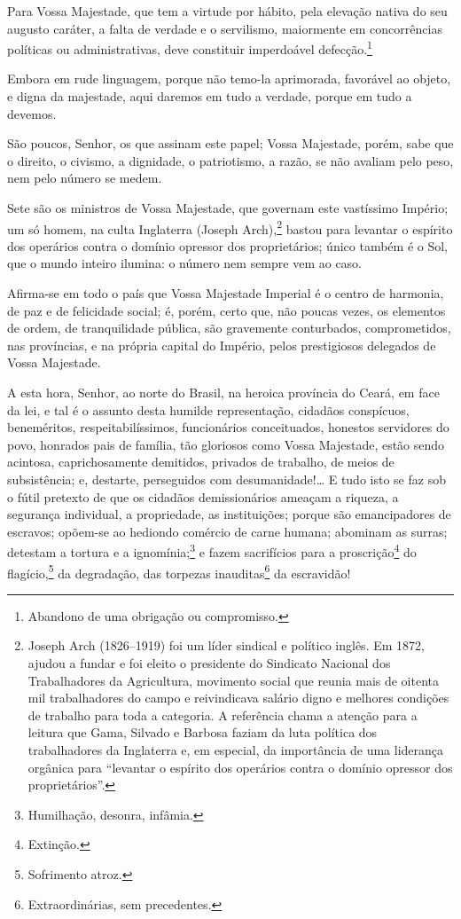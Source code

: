 Para Vossa Majestade, que tem a virtude por hábito, pela elevação nativa
do seu augusto caráter, a falta de verdade e o servilismo, maiormente em
concorrências políticas ou administrativas, deve constituir imperdoável
defecção.\footnote{Abandono de uma obrigação ou compromisso.}

Embora em rude linguagem, porque não temo-la aprimorada, favorável ao
objeto, e digna da majestade, aqui daremos em tudo a verdade, porque em
tudo a devemos.

São poucos, Senhor, os que assinam este papel; Vossa Majestade, porém,
sabe que o direito, o civismo, a dignidade, o patriotismo, a razão, se
não avaliam pelo peso, nem pelo número se medem.

Sete são os ministros de Vossa Majestade, que governam este vastíssimo
Império; um só homem, na culta Inglaterra (Joseph Arch),\footnote{
  Joseph Arch (1826--1919) foi um líder sindical e político inglês. Em
  1872, ajudou a fundar e foi eleito o presidente do Sindicato Nacional
  dos Trabalhadores da Agricultura, movimento social que reunia mais de
  oitenta mil trabalhadores do campo e reivindicava salário digno e
  melhores condições de trabalho para toda a categoria. A referência chama
  a atenção para a leitura que Gama, Silvado e Barbosa faziam
  da luta política dos trabalhadores da Inglaterra e, em especial, da
  importância de uma liderança orgânica para ``levantar o espírito dos
  operários contra o domínio opressor dos proprietários''.} bastou para
levantar o espírito dos operários contra o domínio opressor dos
proprietários; único também é o Sol, que o mundo inteiro ilumina: o
número nem sempre vem ao caso.

Afirma-se em todo o país que Vossa Majestade Imperial é o centro de
harmonia, de paz e de felicidade social; é, porém, certo que, não poucas
vezes, os elementos de ordem, de tranquilidade pública, são gravemente
conturbados, comprometidos, nas províncias, e na própria capital do
Império, pelos prestigiosos delegados de Vossa Majestade.

A esta hora, Senhor, ao norte do Brasil, na heroica província do Ceará,
em face da lei, e tal é o assunto desta humilde representação, cidadãos
conspícuos, beneméritos, respeitabilíssimos, funcionários conceituados,
honestos servidores do povo, honrados pais de família, tão gloriosos
como Vossa Majestade, estão sendo acintosa, caprichosamente demitidos,
privados de trabalho, de meios de subsistência; e, destarte, perseguidos
com desumanidade!\ldots{} E tudo isto se faz sob o fútil pretexto de que os
cidadãos demissionários ameaçam a riqueza, a segurança individual, a
propriedade, as instituições; porque são emancipadores de escravos;
opõem-se ao hediondo comércio de carne humana; abominam as surras;
detestam a tortura e a ignomínia;\footnote{Humilhação, desonra,
  infâmia.} e fazem sacrifícios para a proscrição\footnote{Extinção.}
do flagício,\footnote{Sofrimento atroz.} da degradação, das torpezas
inauditas\footnote{Extraordinárias, sem precedentes.} da escravidão!

